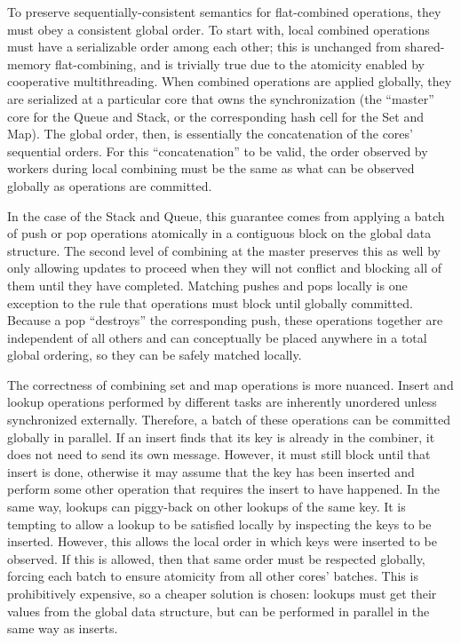 To preserve sequentially-consistent semantics for flat-combined operations, they must obey a consistent global order.
To start with, local combined operations must have a serializable order among each other; this is unchanged from shared-memory flat-combining, and is trivially true due to the atomicity enabled by cooperative multithreading.
When combined operations are applied globally, they are serialized at a particular core that owns the synchronization (the ``master'' core for the Queue and Stack, or the corresponding hash cell for the Set and Map). The global order, then, is essentially the concatenation of the cores' sequential orders.
For this ``concatenation'' to be valid, the order observed by workers during local combining must be the same as what can be observed globally as operations are committed.

In the case of the Stack and Queue, this guarantee comes from applying a batch of push or pop operations atomically in a contiguous block on the global data structure. The second level of combining at the master preserves this as well by only allowing updates to proceed when they will not conflict and blocking all of them until they have completed.
Matching pushes and pops locally is one exception to the rule that operations must block until globally committed. Because a pop ``destroys'' the corresponding push, these operations together are independent of all others and can conceptually be placed anywhere in a total global ordering, so they can be safely matched locally.

The correctness of combining set and map operations is more nuanced.
Insert and lookup operations performed by different tasks are inherently unordered unless synchronized externally.
Therefore, a batch of these operations can be committed globally in parallel.
If an insert finds that its key is already in the combiner, it does not need to send its own message. However, it must still block until that insert is done, otherwise it may assume that the key has been inserted and perform some other operation that requires the insert to have happened.
In the same way, lookups can piggy-back on other lookups of the same key.
It is tempting to allow a lookup to be satisfied locally by inspecting the keys to be inserted.
However, this allows the local order in which keys were inserted to be observed.
If this is allowed, then that same order must be respected globally, forcing each batch to ensure atomicity from all other cores' batches. This is prohibitively expensive, so a cheaper solution is chosen: lookups must get their values from the global data structure, but can be performed in parallel in the same way as inserts.

